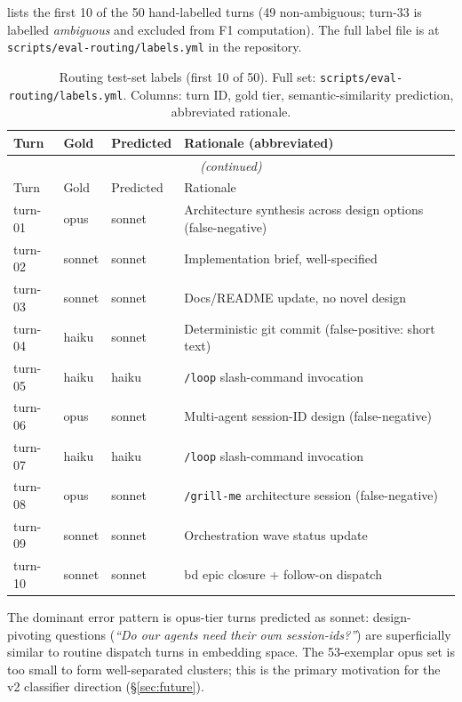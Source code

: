  lists the first 10 of the 50 hand-labelled
turns (49 non-ambiguous; turn-33 is labelled \emph{ambiguous} and
excluded from F1 computation).
The full label file is at
\texttt{scripts/eval-routing/labels.yml} in the repository.

\begin{longtable}{lllp{7cm}}
\caption{Routing test-set labels (first 10 of 50).
  Full set: \texttt{scripts/eval-routing/labels.yml}.
  Columns: turn ID, gold tier, semantic-similarity prediction,
  abbreviated rationale.}
\label{tab:routing-labels} \\
\toprule
Turn & Gold & Predicted & Rationale (abbreviated) \\
\midrule
\endfirsthead
\multicolumn{4}{c}{\textit{(continued)}} \\
\toprule
Turn & Gold & Predicted & Rationale \\
\midrule
\endhead
\bottomrule
\endlastfoot
turn-01 & opus   & sonnet & Architecture synthesis across design options (false-negative) \\
turn-02 & sonnet & sonnet & Implementation brief, well-specified \\
turn-03 & sonnet & sonnet & Docs/README update, no novel design \\
turn-04 & haiku  & sonnet & Deterministic git commit (false-positive: short text) \\
turn-05 & haiku  & haiku  & \texttt{/loop} slash-command invocation \\
turn-06 & opus   & sonnet & Multi-agent session-ID design (false-negative) \\
turn-07 & haiku  & haiku  & \texttt{/loop} slash-command invocation \\
turn-08 & opus   & sonnet & \texttt{/grill-me} architecture session (false-negative) \\
turn-09 & sonnet & sonnet & Orchestration wave status update \\
turn-10 & sonnet & sonnet & bd epic closure + follow-on dispatch \\
\end{longtable}

The dominant error pattern is opus-tier turns predicted as sonnet:
design-pivoting questions (\textit{``Do our agents need their own
session-ids?''}) are superficially similar to routine dispatch
turns in embedding space.
The 53-exemplar opus set is too small to form well-separated
clusters; this is the primary motivation for the v2 classifier
direction (\S\ref{sec:future}).

